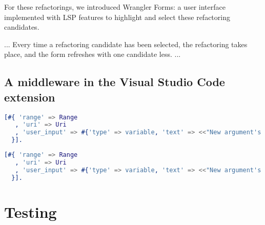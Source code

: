 For these refactorings, we introduced Wrangler Forms: a user interface implemented with LSP features to highlight and select these refactoring candidates.


...
Every time a refactoring candidate has been selected, the refactoring takes place, and the form refreshes with one candidate less.
...

\label{src:behaviours}

\subsection{A middleware in the Visual Studio Code extension}
\label{src:middleware}


\begin{lstlisting}[language=erlang]
  [#{ 'range' => Range
   , 'uri' => Uri
   , 'user_input' => #{'type' => variable, 'text' => <<"New argument's name">>}
  }].
\end{lstlisting}

\begin{lstlisting}[language=erlang]
  [#{ 'range' => Range
   , 'uri' => Uri
   , 'user_input' => #{'type' => variable, 'text' => <<"New argument's name">>, 'value' => <<"NewVar">>}
  }].
\end{lstlisting}


\section{Testing}
